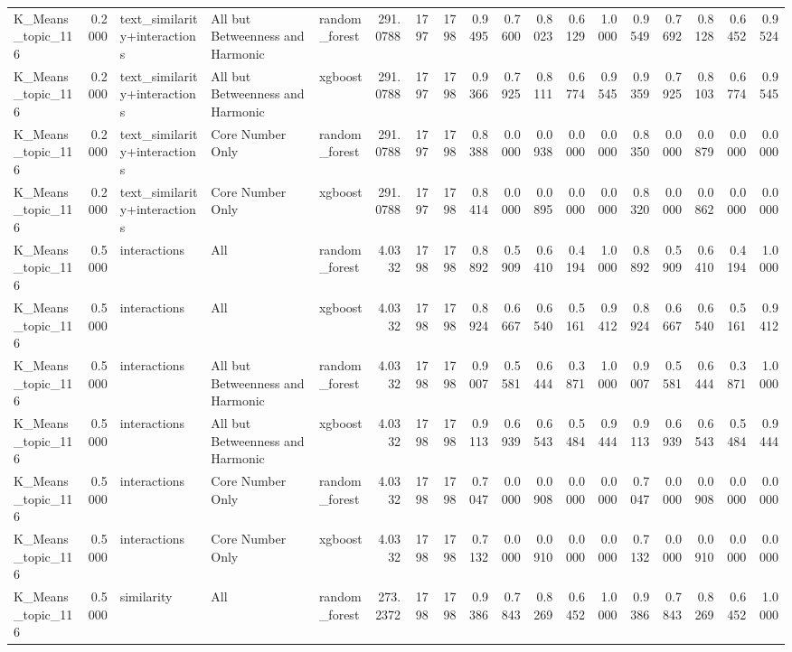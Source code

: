 \begin{tabular}{lrlllrrrrrrrrrrrrr}
K_Means_topic_116 & 0.2000 & text_similarity+interactions & All but Betweenness and Harmonic & random_forest & 291.0788 & 1797 & 1798 & 0.9495 & 0.7600 & 0.8023 & 0.6129 & 1.0000 & 0.9549 & 0.7692 & 0.8128 & 0.6452 & 0.9524 \\
K_Means_topic_116 & 0.2000 & text_similarity+interactions & All but Betweenness and Harmonic & xgboost & 291.0788 & 1797 & 1798 & 0.9366 & 0.7925 & 0.8111 & 0.6774 & 0.9545 & 0.9359 & 0.7925 & 0.8103 & 0.6774 & 0.9545 \\
K_Means_topic_116 & 0.2000 & text_similarity+interactions & Core Number Only & random_forest & 291.0788 & 1797 & 1798 & 0.8388 & 0.0000 & 0.0938 & 0.0000 & 0.0000 & 0.8350 & 0.0000 & 0.0879 & 0.0000 & 0.0000 \\
K_Means_topic_116 & 0.2000 & text_similarity+interactions & Core Number Only & xgboost & 291.0788 & 1797 & 1798 & 0.8414 & 0.0000 & 0.0895 & 0.0000 & 0.0000 & 0.8320 & 0.0000 & 0.0862 & 0.0000 & 0.0000 \\
K_Means_topic_116 & 0.5000 & interactions & All & random_forest & 4.0332 & 1798 & 1798 & 0.8892 & 0.5909 & 0.6410 & 0.4194 & 1.0000 & 0.8892 & 0.5909 & 0.6410 & 0.4194 & 1.0000 \\
K_Means_topic_116 & 0.5000 & interactions & All & xgboost & 4.0332 & 1798 & 1798 & 0.8924 & 0.6667 & 0.6540 & 0.5161 & 0.9412 & 0.8924 & 0.6667 & 0.6540 & 0.5161 & 0.9412 \\
K_Means_topic_116 & 0.5000 & interactions & All but Betweenness and Harmonic & random_forest & 4.0332 & 1798 & 1798 & 0.9007 & 0.5581 & 0.6444 & 0.3871 & 1.0000 & 0.9007 & 0.5581 & 0.6444 & 0.3871 & 1.0000 \\
K_Means_topic_116 & 0.5000 & interactions & All but Betweenness and Harmonic & xgboost & 4.0332 & 1798 & 1798 & 0.9113 & 0.6939 & 0.6543 & 0.5484 & 0.9444 & 0.9113 & 0.6939 & 0.6543 & 0.5484 & 0.9444 \\
K_Means_topic_116 & 0.5000 & interactions & Core Number Only & random_forest & 4.0332 & 1798 & 1798 & 0.7047 & 0.0000 & 0.0908 & 0.0000 & 0.0000 & 0.7047 & 0.0000 & 0.0908 & 0.0000 & 0.0000 \\
K_Means_topic_116 & 0.5000 & interactions & Core Number Only & xgboost & 4.0332 & 1798 & 1798 & 0.7132 & 0.0000 & 0.0910 & 0.0000 & 0.0000 & 0.7132 & 0.0000 & 0.0910 & 0.0000 & 0.0000 \\
K_Means_topic_116 & 0.5000 & similarity & All & random_forest & 273.2372 & 1798 & 1798 & 0.9386 & 0.7843 & 0.8269 & 0.6452 & 1.0000 & 0.9386 & 0.7843 & 0.8269 & 0.6452 & 1.0000 \\

\end{tabular}
